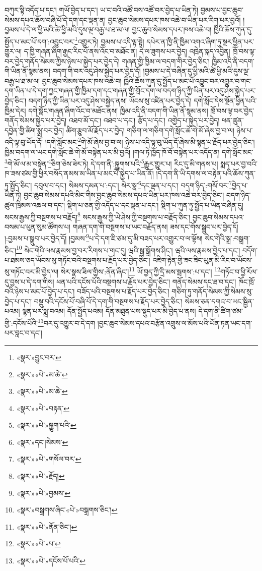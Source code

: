 བཀུར་སྟི་འདོད་པ་དང་། གཡོ་བྱེད་པ་དང་། ཡ་ང་བའི་འཚོ་བས་འཚོ་བར་བྱེད་པ་ཡིན་ཏེ། བྱམས་པ་བྱང་ཆུབ་སེམས་དཔའ་ཆོས་བཞི་པོ་དེ་དག་དང་ལྡན་ན། བྱང་ཆུབ་སེམས་དཔར་ཁས་འཆེ་བ་ཡིན་པར་རིག་པར་བྱའོ། །བྱམས་པ་དེ་ལ་ཕྱི་མའི་ཚེ་ཕྱི་མའི་དུས་ལྔ་བརྒྱ་པ་ཐ་མ་ལ། བྱང་ཆུབ་སེམས་དཔར་ཁས་འཆེ་བ། ཁྱིའི་ཆོས་ཀུན་དུ་སྤྱོད་པ་མང་པོ་དག་:འབྱུང་བར་\footnote{«སྣར་»བྱུང་བར་}འགྱུར་ཏེ། བྱམས་པ་འདི་ལྟ་སྟེ། དཔེར་ན་ཁྱི་ནི་ཁྱིམ་འགའ་ཞིག་ཏུ་སྔར་ཕྱིན་པར་གྱུར་ལ། ད་ཁྱི་གཞན་ཞིག་རྒྱང་རིང་པོ་ནས་འོང་བ་མཐོང་ན། དེ་ལ་ཟུགས་པར་བྱེད། འཁྲེན་སྐད་འབྱིན། ཁྲོ་བས་ལྟ་བར་བྱེད་གནོད་སེམས་ཀྱིས་ཉེས་པ་སྐྱེད་པར་བྱེད་དེ། གཞན་གྱི་ཁྱིམ་ལ་བདག་གིར་བྱེད་ཅིང་། ཁྱིམ་འདི་ནི་བདག་གི་ཡིན་ནོ་སྙམ་ནས། བདག་གི་བར་འདུ་ཤེས་སྐྱེད་པར་བྱེད་དོ། །བྱམས་པ་དེ་བཞིན་དུ་ཕྱི་མའི་ཚེ་ཕྱི་མའི་དུས་ལྔ་བརྒྱ་པ་ཐ་མ་ལ། བྱང་ཆུབ་སེམས་དཔར་ཁས་འཆེ་བ། ཁྱིའི་ཆོས་ཀུན་དུ་སྤྱོད་པ་མང་པོ་འབྱུང་བར་འགྱུར་བ་གང་དག་ཡིན་པ་དེ་དག་ཀྱང་གཞན་གྱི་ཁྱིམ་དག་དང་གཞན་གྱི་གྲོང་དག་ལ་བདག་ཉིད་ཀྱི་ཡིན་པར་འདུ་ཤེས་སྐྱེད་པར་བྱེད་ཅིང་། བདག་ཉིད་ཀྱི་ཡིན་པར་འདུ་ཤེས་བསྐྱེད་ནས། ཡོངས་སུ་འཛིན་པར་བྱེད་དེ། དགེ་སློང་དེས་སྔོན་ཕྱིན་པའི་ཁྱིམ་དེར། དགེ་སློང་གཞན་ཞིག་འོང་བ་མཐོང་ནས། ཁྱིམ་འདི་ནི་བདག་གི་ཡིན་ནོ་སྙམ་ནས། ཁྲོ་བས་ལྟ་བར་བྱེད་གནོད་སེམས་སྐྱེད་པར་བྱེད། འཐབ་མོ་དང་། འཐབ་པ་དང་། རྩོད་པ་དང་། འགྱེད་པ་སྐྱེད་པར་བྱེད། ཕན་ཚུན་དབྱེན་གྱི་ཚིག་སྨྲ་བར་བྱེད། ཚིག་རྩུབ་མོ་རྗོད་པར་བྱེད། གཅིག་ལ་གཅིག་དགེ་སློང་ཆེ་གེ་མོ་ཞེས་བྱ་བ་ལ། ཉེས་པ་འདི་ལྟ་བུ་ཡོད་དོ། །དགེ་སློང་མང་\footnote{«སྣར་»«པེ་»མ་ཆེ་}གེ་མོ་ཞེས་བྱ་བ་ལ། ཉེས་པ་འདི་ལྟ་བུ་ཡོད་དོ་ཞེས་མི་སྙན་པ་རྗོད་པར་བྱེད་ཅིང་། ཁྱིམ་བདག་ལ་ཡང་དགེ་སློང་ཆེ་གེ་མོ་བསྟེན་པར་མི་བྱའོ། །གལ་ཏེ་ཁྱོད་ཁོ་བོ་བསྟེན་པར་འདོད་ན། དགེ་སློང་མང་\footnote{«སྣར་»«པེ་»མ་ཆེ་}གེ་མོ་ལ་མ་བསྟེན་\footnote{«སྣར་»«པེ་»བརྟན་}ཅིག་ཅེས་ཟེར་ཏེ། དེ་དག་ནི་:སྐྱུགས་པའི་\footnote{«སྣར་»«པེ་»སྐྱུག་པའི་}རྒྱུར་གྱུར་པ། རིང་དུ་མི་གནས་པ། སྨད་པར་བྱ་བའི་ཁ་ཟས་ཙམ་གྱི་ཕྱིར་བསོད་ནམས་མ་ཡིན་པ་མང་པོ་སྐྱེད་པ་ཡིན་ནོ། །དེ་དག་ནི་ཡི་དགས་ལ་བརྟེན་པའི་ཆོས་ཀུན་ཏུ་སྤྱོད་ཅིང་། དབུལ་བ་དང་། སེམས་དམན་པ་:དང་། སེར་སྣ་\footnote{«སྣར་»དང་།སེམས་}དང་ལྡན་པ་དང་། བདག་ཉིད་:གསོ་བར་\footnote{«སྣར་»«པེ་»གསོལ་བར་}བྱེད་པ་ཡིན་ཏེ། བྱང་ཆུབ་སེམས་དཔའི་མིང་གིས་བྱང་ཆུབ་སེམས་དཔའ་ཡིན་པར་ཁས་འཆེ་བར་བྱེད་ཅིང་། བདག་ཉིད་ཚུལ་ཁྲིམས་འཆལ་བ་དང་། སྡིག་པ་ཅན་གྱི་འདོད་པ་དང་ལྡན་པ་དང་། སྡིག་པ་ཀུན་ཏུ་སྤྱོད་པ་ཡིན་བཞིན་དུ། སངས་རྒྱས་ཀྱི་བསྔགས་པ་བརྗོད།\footnote{«སྣར་»«པེ་»རྗོད།} སངས་རྒྱས་ཀྱི་ཡེ་ཤེས་ཀྱི་བསྔགས་པ་བརྗོད་ཅིང་། བྱང་ཆུབ་སེམས་དཔའ་བསམ་པ་ཕུན་སུམ་ཚོགས་པ། གཞན་དག་གི་བསྔགས་པ་ཡང་བརྗོད་ནས། ཟས་དང་གོས་སྒྲུབ་པར་བྱེད་དོ། །:བྱམས་པ་སྒྲུབ་པར་བྱེད་དོ། །བྱམས་\footnote{«སྣར་»«པེ་»བྱམས་}པ་དེ་དག་ཇི་ཙམ་དུ་མི་བཟད་པར་འགྱུར་བ་ལ་ལྟོས། སེང་གེའི་སྒྲ་:བསྒྲག་ཅིང་།\footnote{«སྣར་»བསྒྲགས་ཞིང་«པེ་»བསྒྲགས་ཅིང་།} སེང་གེའི་ལས་རྣམས་བྱ་བར་རིགས་པ་གང་དུ། ཝའི་སྒྲ་སྒྲོགས་ཤིང་། ཝའི་ལས་རྣམས་བྱེད་པ་དང་། བདོག་པ་ཐམས་ཅད་ཡོངས་སུ་གཏོང་བའི་བསྔགས་པ་རྗོད་པར་བྱེད་ཅིང་། འཇིག་རྟེན་གྱི་ཟང་ཟིང་ཡུན་མི་རིང་བ་ཡོངས་སུ་གཏོང་བར་མི་བྱེད་ལ། སེར་སྣས་ཟིལ་གྱིས་:ནོན་ཞིང་།\footnote{«སྣར་»«པེ་»ནོན་ཅིང་།} ཡོ་བྱད་ཀྱི་དྲི་མས་སྦགས་:པ་དང་། \footnote{«སྣར་»«པེ་»པ་}གཏོང་བ་ཕྱི་རོལ་དུ་བྱས་པ་དེ་དག་གིས། ཕན་པའི་དངོས་པོའི་བསྔགས་པ་རྗོད་པར་བྱེད་ཅིང་། གནོད་སེམས་དང་ཐ་བ་དང་། ཁོང་ཁྲོ་བའི་ཉེས་པ་མང་པོ་བྱེད་པ་དང་། བཟོད་པའི་བསྔགས་པ་རྗོད་པར་བྱེད་ཅིང་། གཅིག་ཏུ་གནོད་སེམས་ཀྱི་སེམས་སུ་བྱེད་པ་དང་། བསྡུ་བའི་དངོས་པོ་བཞི་པོ་དེ་དག་གི་བསྔགས་པ་རྗོད་པར་བྱེད་ཅིང་། སེམས་ཅན་དགའ་བ་ཡང་སྦྱིན་པའམ། སྙན་པར་སྨྲ་བའམ། དོན་སྤྱོད་པའམ། དོན་མཐུན་པས་སྡུད་པར་མི་བྱེད་པ་ནས། དེ་དག་ནི་ཚིག་ཙམ་གྱི་:དངོས་པོའི་\footnote{«སྣར་»«པེ་»དངོས་པོ་པའི་}བར་དུ་འགྱུར་བ་དེ་དག །བྱང་ཆུབ་སེམས་དཔའ་བརྩོན་འགྲུས་ལ་མོས་པའི་ཡོན་ཏན་ཡང་དག་པར་བླང་བ་དང་། 